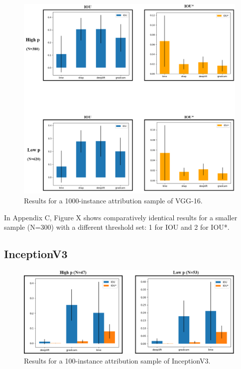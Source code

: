 \documentclass[main]{subfiles}
\begin{document}
\begin{figure}[h]\centering
\vfill
\includegraphics[scale=0.32]{vgg_0_5_and_1.png}
\caption{Results for a 1000-instance attribution sample of VGG-16. }
\label{vggAfig}
\vfill
\end{figure}

In Appendix C, Figure X shows comparatively identical results for a smaller sample (N=300) with a different threshold set: 1 for IOU and 2 for IOU*.

\newpage


\subsection{InceptionV3}

\begin{figure}[h]
\centering
\includegraphics[scale=0.35]{inception.png}
\caption{Results for a 100-instance attribution sample of InceptionV3. }
\label{inceptionFig}
\end{figure}
\end{document}
